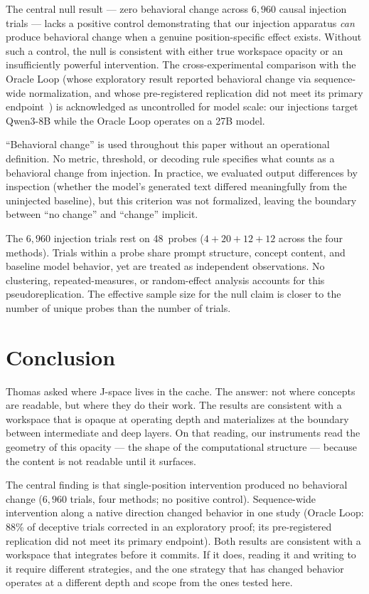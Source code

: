 \documentclass[11pt,a4paper]{article}
\begin{document}
The central null result --- zero behavioral change across $6{,}960$ causal
injection trials --- lacks a positive control demonstrating that our injection
apparatus \emph{can} produce behavioral change when a genuine position-specific
effect exists.  Without such a control, the null is consistent with either true
workspace opacity or an insufficiently powerful intervention.  The
cross-experimental comparison with the Oracle Loop (whose exploratory
result reported behavioral change via sequence-wide normalization, and
whose pre-registered replication did not meet its primary
endpoint~\citep{cc2026targeted}) is acknowledged as
uncontrolled for model scale: our injections target Qwen3-8B while the Oracle
Loop operates on a 27B model.

``Behavioral change'' is used throughout this paper without an operational
definition.  No metric, threshold, or decoding rule specifies what counts as a
behavioral change from injection.  In practice, we evaluated output differences
by inspection (whether the model's generated text differed meaningfully from the
uninjected baseline), but this criterion was not formalized, leaving the
boundary between ``no change'' and ``change'' implicit.

The $6{,}960$ injection trials rest on 48~probes ($4 + 20 + 12 + 12$ across the
four methods).  Trials within a probe share prompt structure, concept content,
and baseline model behavior, yet are treated as independent observations.  No
clustering, repeated-measures, or random-effect analysis accounts for this
pseudoreplication.  The effective sample size for the null claim is closer to the
number of unique probes than the number of trials.

\section{Conclusion}
\label{sec:conclusion}

Thomas asked where J-space lives in the cache. The answer: not where
concepts are readable, but where they do their work. The results are
consistent with a workspace that is opaque at operating depth and
materializes at the boundary between
intermediate and deep layers. On that reading, our instruments read the
geometry of this opacity --- the shape of the computational structure
--- because the content is not readable until it surfaces.

The central finding is that single-position intervention produced no
behavioral change ($6{,}960$ trials, four methods; no positive control).
Sequence-wide intervention along a native direction changed behavior
in one study (Oracle Loop: 88\% of deceptive trials corrected in an exploratory proof; its pre-registered replication did not meet its primary endpoint). Both results are consistent with a workspace that integrates
before it commits. If it does, reading it and writing to it require
different strategies, and the one strategy that has changed behavior
operates at a different depth and scope from the ones tested here.
\end{document}

